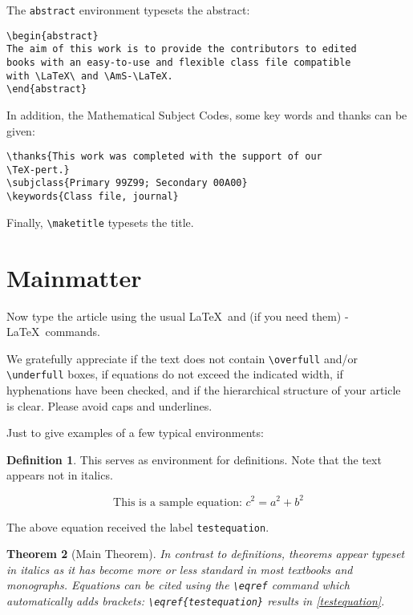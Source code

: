 \documentclass{birkjour}
\newtheorem{thm}{Theorem}[section]
\theoremstyle{definition}
\newtheorem{defn}[thm]{Definition}
\theoremstyle{remark}
\numberwithin{equation}{section}
\begin{document}
The \verb+abstract+ environment typesets the abstract:
\begin{verbatim}
\begin{abstract}
The aim of this work is to provide the contributors to edited
books with an easy-to-use and flexible class file compatible
with \LaTeX\ and \AmS-\LaTeX.
\end{abstract}
\end{verbatim}
In addition, the Mathematical Subject Codes, some key words and thanks can be given:
\begin{verbatim}
\thanks{This work was completed with the support of our
\TeX-pert.}
\subjclass{Primary 99Z99; Secondary 00A00}
\keywords{Class file, journal}
\end{verbatim}
Finally, \verb+\maketitle+ typesets the title.

\section{Mainmatter}
Now type the article using the usual \LaTeX\ and (if you need them)
\AmS-\LaTeX\ commands.

We gratefully appreciate if the text does
not contain \verb+\overfull+ and/or \verb+\underfull+ boxes, if
equations do not exceed the indicated width, if hyphenations have
been checked, and if the hierarchical structure of your article is
clear. Please avoid caps and underlines.

Just to give examples of a few typical environments:

\begin{defn}
This serves as environment for definitions. Note that the text
appears not in italics.
\end{defn}

\begin{equation}\label{testequation}
\text{This is a sample equation: } c^2=a^2+b^2
\end{equation}

The above equation received the label \verb+testequation+.

\begin{thm}[Main Theorem]
In contrast to definitions, theorems appear typeset in italics as
it has become more or less standard in most textbooks and
monographs. Equations can be cited using the \verb+\eqref+ command which
automatically adds brackets: \verb+\eqref{testequation}+ results in \eqref{testequation}.
\end{thm}
\end{document}
